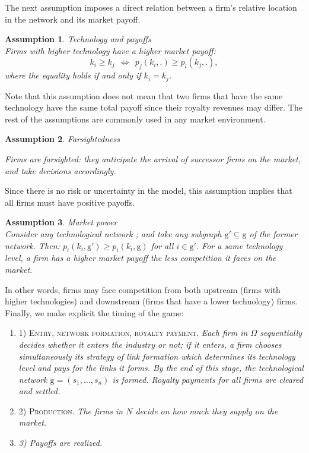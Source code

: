 \documentclass{article}
\newtheorem{assumption}{Assumption}
\begin{document}
\indent The next assumption imposes a direct relation between a firm's relative location in the network and its market payoff.\\  

\begin{assumption}{Technology and payoffs} \label{ass1}\\
Firms with higher technology have a higher market payoff:
\begin{equation*}
     k_i\geq k_j~~ \Leftrightarrow ~~ p_j(k_i,.)\geq  p_i(k_j,.),
\end{equation*}
where the equality holds if and only if $k_i=k_j$.
\end{assumption}

Note that this assumption does not mean that two firms that have the same technology have the same total payoff since their royalty revenues may differ. The rest of the assumptions are commonly used in any market environment. \\

\begin{assumption}{Farsightedness} \label{ass2}

Firms are farsighted: they anticipate the arrival of successor firms on the market, and take decisions accordingly. 
\end{assumption}

Since there is no risk or uncertainty in the model, this assumption implies that all firms must have positive payoffs. 

\begin{assumption}{Market power}\label{ass3}\\
Consider any technological network ; and take any subgraph $\text{g}'\subseteq \text{g}$ of the former network. Then: $p_i(k_i,\text{g}')\geq p_i(k_i,\text{g})$ for all $i\in \text{g}'$. For a same technology level, a firm has a higher market payoff the less competition it faces on the market. 
\end{assumption}

In other words, firms may face competition from both upstream (firms with higher technologies) and downstream (firms that have a lower technology) firms. \\

\indent Finally, we make explicit the timing of the game:       

\begin{enumerate}
    \item[] \textsc{1) Entry, network formation, royalty payment.} \textit{Each firm in $\Omega$ sequentially decides whether it enters the industry or not; if it enters, a firm chooses simultaneously its strategy of link formation which determines its technology level and pays for the links it forms. By the end of this stage, the technological network $\text{g}=(s_1,\ldots,s_n)$ is formed. Royalty payments for all firms are cleared and settled. }
    \item[] \textsc{2) Production.} \textit{The firms in $N$ decide on how much they supply on the market.}
    \item[] \textit{3) Payoffs are realized.}
\end{enumerate}
\end{document}
